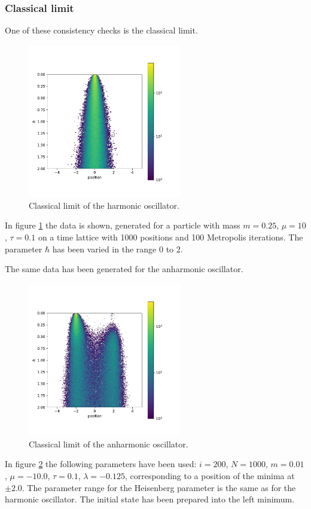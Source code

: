 \documentclass{scrartcl}
\begin{document}
	\subsubsection{Classical limit}
		One of these consistency checks is the classical limit.
			\begin{figure}[H]
			\centering
				\includegraphics[width=0.6\textwidth]{../imgs/harmonic_oscillator_classical_limit/harmonic_oscillator_10_classical_limit.pdf}
			\caption{Classical limit of the harmonic oscillator.}
			\label{fig:harmonic_oscillator_classical_limit}
		\end{figure}
		In figure \ref{fig:harmonic_oscillator_classical_limit} the data is shown, generated for a particle with mass $m = 0.25$, $\mu = 10$, $\tau = 0.1$ on a time lattice with 1000 positions and 100 Metropolis iterations.
		The parameter $\hbar$ has been varied in the range 0 to 2.

		The same data has been generated for the anharmonic oscillator.
		\begin{figure}[H]
			\centering
				\includegraphics[width=0.6\textwidth]{../imgs/anharmonic_oscillator_classical_limit/anharmonic_oscillator_classical_limit.pdf}
			\caption{Classical limit of the anharmonic oscillator.}
			\label{fig:anharmonic_oscillator_classical_limit}
		\end{figure}
		In figure \ref{fig:anharmonic_oscillator_classical_limit} the following parameters have been used: $i = 200$, $N = 1000$, $m = 0.01$, $\mu = -10.0$, $\tau = 0.1$, $\lambda = -0.125$, corresponding to a position of the minima at $\pm 2.0$.
		The parameter range for the Heisenberg parameter is the same as for the harmonic oscillator.
		The initial state has been prepared into the left minimum.
\end{document}
